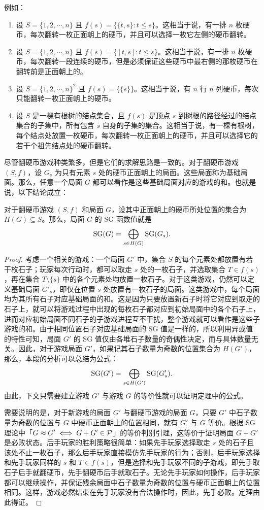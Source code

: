 例如：
\begin{enumerate}
	\item 设 $S=\{1,2,\cdots,n\}$ 且 $f(s)=\{\{t,s\}:t \le s\}$。这相当于说，有一排 $n$ 枚硬币，每次翻转一枚正面朝上的硬币，并且可以选择一枚它左侧的硬币翻转。
	\item 设 $S=\{1,2,\cdots,n\}$ 且 $f(s)=\{[t,s]:t \le s\}$。这相当于说，有一排 $n$ 枚硬币，每次翻转一段连续的硬币，但是必须保证这些硬币中最右侧的那枚硬币在翻转前是正面朝上的。
	\item 设 $S=\{1,2,\cdots,n\}^2$ 且 $f(s)=\{\{s\}\}$。这相当于说，有 $n$ 行 $n$ 列硬币，每次只能翻转一枚正面朝上的硬币。
	\item 设 $S$ 是一棵有根树的结点集合，且 $f(s)$ 是顶点 $s$ 到树根的路径经过的结点集合的子集中，所有包含 $s$ 自身的子集的集合。这相当于说，有一棵有根树，每个结点处放置一枚硬币，每次翻转一枚正面朝上的硬币，并且可以选择它的若干个祖先结点处的硬币翻转。
\end{enumerate}

尽管翻硬币游戏种类繁多，但是它们的求解思路是一致的。对于翻硬币游戏 $(S,f)$，设 $G_s$ 为只有元素 $s$ 处的硬币正面朝上的局面。这些局面称为基础局面。那么，任意一个局面 $G$ 都可以看作是这些基础局面对应的游戏的和。也就是说，以下结论成立：

\begin{theorem}
	对于翻硬币游戏 $(S,f)$ 和局面 $G$，设其中正面朝上的硬币所处位置的集合为 $H(G)\subseteq S$。那么，局面 $G$ 的 SG 函数值就是
	$$\operatorname{SG}(G) = \bigoplus_{s\in H(G)}\operatorname{SG}(G_s).$$
\end{theorem}

\begin{proof}
	考虑一个相关的游戏：一个局面 $G'$ 中，集合 $S$ 的每个元素处都放置有若干枚石子；玩家每次行动时，都可以取走 $s$ 处的一枚石子，并选取集合 $T\in f(s)$，再在集合 $T\setminus\{s\}$ 中的各个元素处均放置一枚石子。对于这类游戏，仍然可以定义基础局面 $G'_s$，即仅在位置 $s$ 处放置有一枚石子的局面。这类游戏中，每个局面均为其所有石子对应基础局面的和。这是因为只要放置新石子时将它对应到取走的石子上，就可以将游戏过程中出现的每枚石子都对应到初始局面中的各个石子上，进而对应初始局面不同石子的子游戏进程互不干扰，整个游戏就可以看作是这些子游戏的和。由于相同位置石子对应基础局面的 SG 值是一样的，所以利用异或值的特性可知，局面 $G'$ 的 SG 值仅由各堆石子数量的奇偶性决定，而与具体数量无关。因此，对于游戏局面 $G'$，如果记其石子数量为奇数的位置集合为 $H(G')$，那么，本段的分析可以总结为公式：
	$$
	\operatorname{SG}(G') = \bigoplus_{s\in H(G')} \operatorname{SG}(G'_s).
	$$
	由此，下文只需要建立游戏 $G'$ 与游戏 $G$ 的等价性就可以证明定理中的公式。
	
	需要说明的是，对于新游戏的局面 $G'$ 与翻硬币游戏的局面 $G$，只要 $G'$ 中石子数量为奇数的位置与 $G$ 中硬币正面朝上的位置相同，就有 $G'$ 与 $G$ 等价。根据 SG 理论中「$G\approx G'\iff G+G'\in\mathcal{P}$」的等价判别引理，这等价于证明局面 $G+G'$ 是必败状态。后手玩家的胜利策略很简单：如果先手玩家选择取走 $s$ 处的石子且该处不止一枚石子，那么后手玩家直接模仿先手玩家的行为；否则，后手玩家选择和先手玩家同样的 $s$ 和 $T\in f(s)$，但是选择和先手玩家不同的子游戏，即先手取石子后手就翻硬币，先手翻硬币后手就取石子。无论先手玩家如何操作，后手玩家都可以继续操作，并保证残余局面中石子数量为奇数的位置与硬币正面朝上的位置相同。这样，游戏必然结束在先手玩家没有合法操作时，因此，先手必败。定理由此得证。
\end{proof}

